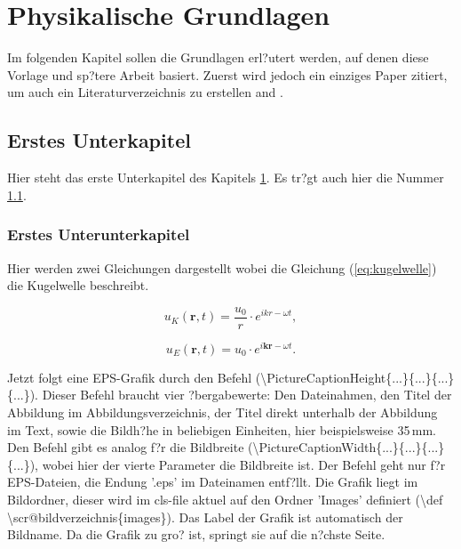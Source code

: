 \chapter{Physikalische Grundlagen}\label{chapter:physikalische_grundlagen}

Im folgenden Kapitel sollen die Grundlagen erl?utert werden, auf denen diese Vorlage und sp?tere Arbeit basiert.
Zuerst wird jedoch ein einziges Paper zitiert, um auch ein Literaturverzeichnis zu erstellen \cite{Oltmann_2010} and \cite{Oltmann_2012}.

\section{Erstes Unterkapitel}\label{sec:erstes_unterkapitel}

Hier steht das erste Unterkapitel des Kapitels \ref{chapter:physikalische_grundlagen}. Es tr?gt auch hier die Nummer \ref{sec:erstes_unterkapitel}.


\subsection{Erstes Unterunterkapitel}\label{subsec:erstes_unterunterkapitel}
Hier werden zwei Gleichungen dargestellt wobei die Gleichung (\ref{eq:kugelwelle}) die Kugelwelle beschreibt.

\begin{equation}
	\label{eq:kugelwelle}
		u_K(\mathbf{r},t)=\frac{u_0}{r} \cdot e^{ikr-\omega t},
\end{equation}

\begin{equation}
	\label{eq:ebene_welle}
		u_E(\mathbf{r},t)=u_0 \cdot e^{i\mathbf{kr}-\omega t}.
\end{equation}

Jetzt folgt eine EPS-Grafik durch den Befehl (\textbackslash PictureCaptionHeight\{...\}\{...\}\{...\}\{...\}). Dieser Befehl braucht vier ?bergabewerte: Den Dateinahmen, den Titel der Abbildung im Abbildungsverzeichnis, der Titel direkt unterhalb der Abbildung im Text, sowie die Bildh?he in beliebigen Einheiten, hier beispielsweise 35\,mm. Den Befehl gibt es analog f?r die Bildbreite (\textbackslash PictureCaptionWidth\{...\}\{...\}\{...\}\{...\}), wobei hier der vierte Parameter die Bildbreite ist. Der Befehl geht nur f?r EPS-Dateien, die Endung '.eps' im Dateinamen entf?llt. Die Grafik liegt im Bildordner, dieser wird im cls-file aktuel auf  den Ordner 'Images' definiert (\textbackslash def \textbackslash scr@bildverzeichnis\{images\}). Das Label der Grafik ist automatisch der Bildname. Da die Grafik zu gro? ist, springt sie auf die n?chste Seite.

